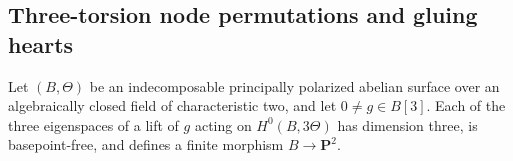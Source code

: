\subsection{Three-torsion node permutations and gluing hearts}

\begin{lemma}
\label{lem:nonproduct-three-theta-finite-eigenmaps-candidate}
Let $(B,\Theta)$ be an indecomposable principally polarized abelian
surface over an algebraically closed field of characteristic two,
and let $0\ne g\in B[3]$. Each of the three eigenspaces of a lift
of $g$ acting on $H^0(B,3\Theta)$ has dimension three, is
basepoint-free, and defines a finite morphism $B\to\mathbf P^2$.
\end{lemma}
